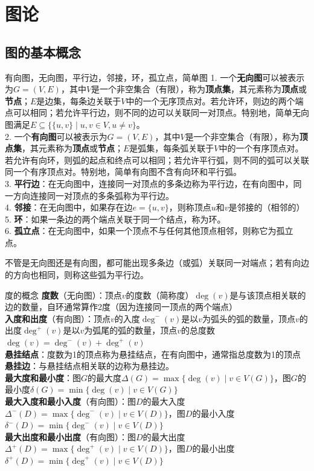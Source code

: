 \chapter{图论}
\section{图的基本概念}
\begin{definition}{有向图，无向图，平行边，邻接，环，孤立点，简单图}{}
1. 一个\textbf{无向图}可以被表示为$G = (V, E)$，其中$V$是一个非空集合（有限），称为\textbf{顶点集}，其元素称为\textbf{顶点}或\textbf{节点}；$E$是边集，每条边关联于$V$中的一个无序顶点对。若允许环，则边的两个端点可以相同；若允许平行边，则不同的边可以关联同一对顶点。特别地，简单无向图满足$E \subseteq \{\{u,v\} \mid u,v \in V, u \neq v\}$。\\
2. 一个\textbf{有向图}可以被表示为$G = (V, E)$，其中$V$是一个非空集合（有限），称为\textbf{顶点集}，其元素称为\textbf{顶点}或\textbf{节点}；$E$是弧集，每条弧关联于$V$中的一个有序顶点对。若允许有向环，则弧的起点和终点可以相同；若允许平行弧，则不同的弧可以关联同一个有序顶点对。特别地，简单有向图不含有向环和平行弧。\\
3.  \textbf{平行边}：在无向图中，连接同一对顶点的多条边称为平行边，在有向图中，同一方向连接同一对顶点的多条弧称为平行边。\\
4. \textbf{邻接}：在无向图中，如果存在边$e = \{u,v\}$，则称顶点$u$和$v$是邻接的（相邻的）\\
5. \textbf{环}：如果一条边的两个端点关联于同一个结点，称为环。\\
6. \textbf{孤立点}：在无向图中，如果一个顶点不与任何其他顶点相邻，则称它为孤立点。
\end{definition}
不管是无向图还是有向图，都可能出现多条边（或弧）关联同一对端点；若有向边的方向也相同，则称这些弧为平行边。
\begin{definition}{度的概念}{}
\textbf{度数}（无向图）：顶点$v$的度数（简称度）$\deg(v)$是与该顶点相关联的边的数量，自环通常算作2度（因为连接同一顶点的两个端点）\\
\textbf{入度和出度}（有向图）：顶点$v$的入度$\deg^-(v)$是以$v$为弧头的弧的数量，顶点$v$的出度$\deg^+(v)$是以$v$为弧尾的弧的数量，顶点$v$的总度数$\deg(v) = \deg^-(v) + \deg^+(v)$\\
\textbf{悬挂结点}：度数为1的顶点称为悬挂结点，在有向图中，通常指总度数为1的顶点\\
\textbf{悬挂边}：与悬挂结点相关联的边称为悬挂边。\\
\textbf{最大度和最小度}：图$G$的最大度$\Delta(G) = \max\{\deg(v) \mid v \in V(G)\}$，图$G$的最小度$\delta(G) = \min\{\deg(v) \mid v \in V(G)\}$\\
\textbf{最大入度和最小入度}（有向图）：图$D$的最大入度$\Delta^-(D) = \max\{\deg^-(v) \mid v \in V(D)\}$，图$D$的最小入度$\delta^-(D) = \min\{\deg^-(v) \mid v \in V(D)\}$\\
\textbf{最大出度和最小出度}（有向图）：图$D$的最大出度$\Delta^+(D) = \max\{\deg^+(v) \mid v \in V(D)\}$，图$D$的最小出度$\delta^+(D) = \min\{\deg^+(v) \mid v \in V(D)\}$
\end{definition}
